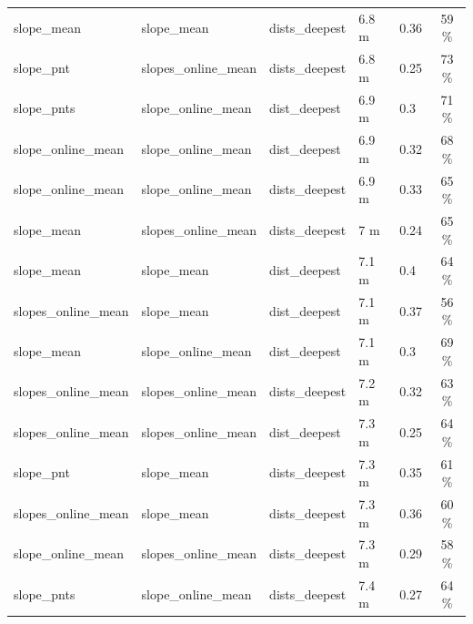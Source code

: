 \documentclass[draft,wrr]{agutexSI2019}
\begin{document}
\begin{table}
\begin{tabular}{lllllc}
            slope\_mean          & slope\_mean          & dists\_deepest         & 6.8 m          & 0.36          & 59 \%          \\
            slope\_pnt           & slopes\_online\_mean & dists\_deepest         & 6.8 m          & 0.25          & 73 \%          \\
            slope\_pnts          & slope\_online\_mean  & dist\_deepest          & 6.9 m          & 0.3           & 71 \%          \\
            slope\_online\_mean  & slope\_online\_mean  & dist\_deepest          & 6.9 m          & 0.32          & 68 \%          \\
            slope\_online\_mean  & slope\_online\_mean  & dists\_deepest         & 6.9 m          & 0.33          & 65 \%          \\
            slope\_mean          & slopes\_online\_mean & dists\_deepest         & 7 m            & 0.24          & 65 \%          \\
            slope\_mean          & slope\_mean          & dist\_deepest          & 7.1 m          & 0.4           & 64 \%          \\
            slopes\_online\_mean & slope\_mean          & dist\_deepest          & 7.1 m          & 0.37          & 56 \%          \\
            slope\_mean          & slope\_online\_mean  & dist\_deepest          & 7.1 m          & 0.3           & 69 \%          \\
            slopes\_online\_mean & slopes\_online\_mean & dists\_deepest         & 7.2 m          & 0.32          & 63 \%          \\
            slopes\_online\_mean & slopes\_online\_mean & dist\_deepest          & 7.3 m          & 0.25          & 64 \%          \\
            slope\_pnt           & slope\_mean          & dists\_deepest         & 7.3 m          & 0.35          & 61 \%          \\
            slopes\_online\_mean & slope\_mean          & dists\_deepest         & 7.3 m          & 0.36          & 60 \%          \\
            slope\_online\_mean  & slopes\_online\_mean & dists\_deepest         & 7.3 m          & 0.29          & 58 \%          \\
            slope\_pnts          & slope\_online\_mean  & dists\_deepest         & 7.4 m          & 0.27          & 64 \%          \\

\end{tabular}
\end{table}
\end{document}
